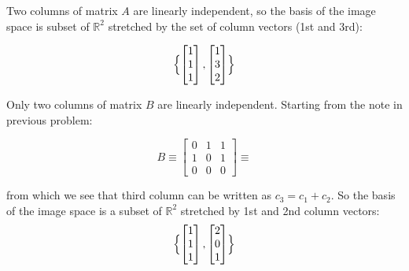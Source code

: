 \documentclass{article}
\newcommand{\1}{\mathbf{1}}
\begin{document}
\begin{enumerate}
	Two columns of matrix $A$ are linearly independent, so the basis of the image space is subset of $\mathbb R^2$ stretched by the set of column vectors (1st and 3rd): 
	
	$$\Bigl\{   \begin{bmatrix} 1 \\ 1 \\ 1\end{bmatrix}, \begin{bmatrix} 1 \\ 3 \\ 2\end{bmatrix} \Bigr\}$$
	
	Only two columns of matrix $B$ are linearly independent. Starting from the note in previous problem:
	
	 $$B \equiv \begin{bmatrix} 0 & 1 & 1 \\ 1 & 0 & 1 \\ 0 & 0 & 0 \end{bmatrix} \equiv $$
	 
	from which we see that third column can be written as $c_3=c_1+c_2$. So the basis of the image space is a subset of $\mathbb R^2$ stretched by 1st and 2nd column vectors:
	$$\Bigl\{   \begin{bmatrix} 1 \\ 1 \\ 1\end{bmatrix}, \begin{bmatrix} 2 \\ 0 \\ 1\end{bmatrix}  \Bigr\}$$
\end{enumerate}
\end{document}
